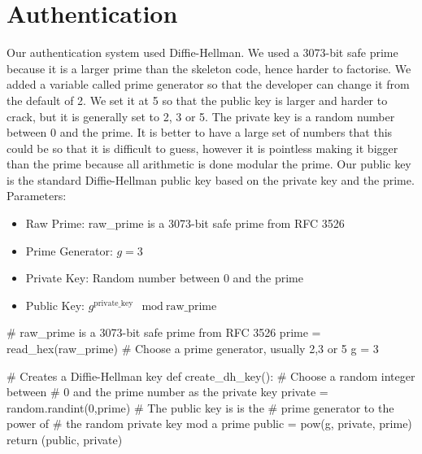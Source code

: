 \documentclass[9pt,a4paper]{article}
\begin{document}
\maketitle
\small
\setlength{\parindent}{0pt}

\section{Authentication}
\vspace{-2ex}
Our authentication system used Diffie-Hellman. We used a 3073-bit safe prime because it is a larger prime than the skeleton code, hence harder to factorise. We added a variable called prime generator so that the developer can change it from the default of 2. We set it at 5 so that the public key is larger and harder to crack, but it is generally set to 2, 3 or 5. The private key is a random number between 0 and the prime. It is better to have a large set of numbers that this could be so that it is difficult to guess, however it is pointless making it bigger than the prime because all arithmetic is done modular the prime. Our public key is the standard Diffie-Hellman public key based on the private key and the prime.\\

Parameters:
\begin{itemize}
\item Raw Prime: raw\_prime is a 3073-bit safe prime from RFC 3526
\item Prime Generator: $g = 3$
\item Private Key: Random number between 0 and the prime
\item Public Key: $g^{\text{private\_key}} \mod \text{raw\_prime}$
\end{itemize}

\begin{center}
\vspace{-2ex}
\begin{python}
# raw_prime is a 3073-bit safe prime from RFC 3526
prime = read_hex(raw_prime)
# Choose a prime generator, usually 2,3 or 5
g = 3

# Creates a Diffie-Hellman key
def create_dh_key():
    # Choose a random integer between 
    # 0 and the prime number as the private key
    private = random.randint(0,prime)
    # The public key is is the
    # prime generator to the power of 
    # the random private key mod a prime
    public  = pow(g, private, prime)
    return (public, private)
\end{python}
\end{center}
\end{document}
